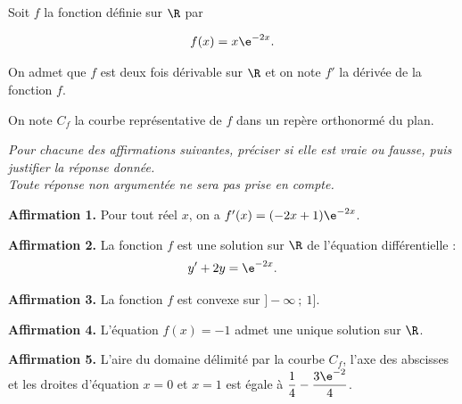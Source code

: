 Soit $f$ la fonction définie sur $\R$ par

\[f(x)=x \e^{-2 x}.\]

On admet que $f$ est deux fois dérivable sur $\R$ et on note $f'$ la dérivée de la fonction $f$.

On note $C_{f}$ la courbe représentative de $f$ dans un repère orthonormé du plan.

\medskip

\emph{Pour chacune des affirmations suivantes, préciser si elle est vraie ou fausse, puis justifier la réponse donnée.\\Toute réponse non argumentée ne sera pas prise en compte.}

\bigskip

	\textbf{Affirmation 1.} Pour tout réel $x$, on a $f'(x)=(-2 x+1) \e^{-2 x}$.

	\bigskip

	\textbf{Affirmation 2.} La fonction $f$ est une solution sur $\R$ de l'équation différentielle :
	\[y'+2 y=\e^{-2 x}.\]

	\bigskip

	\textbf{Affirmation 3.} La fonction $f$ est convexe sur $]-\infty ~;~ 1]$.

	\bigskip

	\textbf{Affirmation 4.} L'équation $f(x)=-1$ admet une unique solution sur $\R$.

	\bigskip

	\textbf{Affirmation 5.} L'aire du domaine délimité par la courbe $C_{f}$, l'axe des abscisses et les droites d'équation $x=0$ et $x=1$ est égale à $\dfrac{1}{4}-\dfrac{3 \e^{-2}}{4}$.

\bigskip
